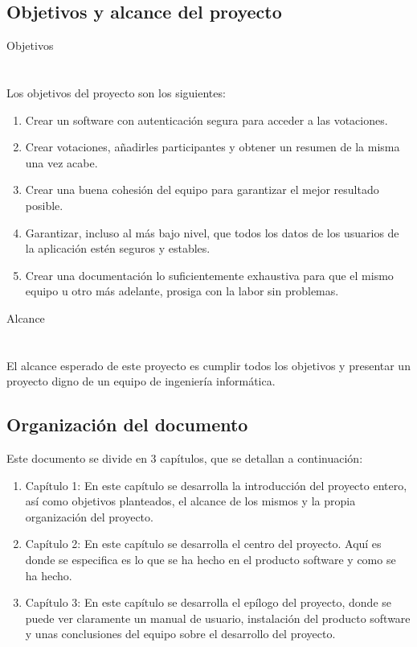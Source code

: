 \documentclass[12pt,letterpaper]{report}
\begin{document}
	\subsection{Objetivos y alcance del proyecto}
		\noindent Objetivos\\
		\\~\\
		Los objetivos del proyecto son los siguientes:
		\begin{enumerate}
			\item Crear un software con autenticación segura para acceder a las votaciones.
			\item Crear votaciones, añadirles participantes y obtener un resumen de la misma una vez acabe.
			\item Crear una buena cohesión del equipo para garantizar el mejor resultado posible.
			\item Garantizar, incluso al más bajo nivel, que todos los datos de los usuarios de la aplicación estén seguros y estables.
			\item Crear una documentación lo suficientemente exhaustiva para que el mismo equipo u otro más adelante, prosiga con la labor sin problemas.
		\end{enumerate}
		\noindent Alcance\\
		\\~\\
		El alcance esperado de este proyecto es cumplir todos los objetivos y presentar un proyecto digno de un equipo de ingeniería informática.
	\subsection{Organización del documento}
		Este documento se divide en 3 capítulos, que se detallan a continuación:
		\begin{enumerate}
			\item Capítulo 1: En este capítulo se desarrolla la introducción del proyecto entero, así como
			      objetivos planteados, el alcance de los mismos y la propia organización del proyecto.
			\item Capítulo 2: En este capítulo se desarrolla el centro del proyecto. Aquí es donde se especifica 
				  es lo que se ha hecho en el producto software y como se ha hecho.
			\item Capítulo 3: En este capítulo se desarrolla el epílogo del proyecto, donde se puede ver claramente
				  un manual de usuario, instalación del producto software y unas conclusiones del equipo sobre el
				  desarrollo del proyecto.
		\end{enumerate}
\end{document}
